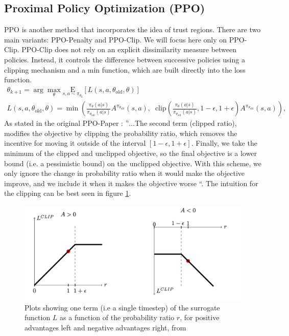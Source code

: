 \subsection{Proximal Policy Optimization (PPO)}
PPO \cite{schulman2017proximalpolicyoptimizationalgorithms} is another method that incorporates the idea of trust regions. There are two main variants: PPO-Penalty and PPO-Clip. We will focus  
here only on PPO-Clip.\newline 
PPO-Clip does not rely on an explicit dissimilarity measure between policies. Instead, it controls the difference between successive 
policies using a clipping mechanism and a min function, which are built directly into the loss function.
\begin{gather*}
\theta_{k+1} = \arg \max_{\theta} \underset{s,a \sim \pi_{\theta_k}}{{\mathrm E}}\left[L(s,a,\theta_\text{old}, \theta)\right] \\
L(s,a,\theta_\text{old},\theta) = \min\left(
\frac{\pi_{\theta}(a|s)}{\pi_{\theta_\text{old}}(a|s)}  A^{\pi_{\theta_\text{old}}}(s,a), \;\;
\text{clip}\left(\frac{\pi_{\theta}(a|s)}{\pi_{\theta_\text{old}}(a|s)}, 1 - \epsilon, 1+\epsilon \right) A^{\pi_{\theta_\text{old}}}(s,a)
\right),
\end{gather*}
As stated in the original PPO-Paper \cite{schulman2017proximalpolicyoptimizationalgorithms} : ''$\dots$The second term (clipped ratio), 
modifies the objective by clipping the probability ratio, which removes the incentive for moving it outside of the interval 
$[1-\epsilon,1+\epsilon]$. Finally, we take the minimum of the clipped and unclipped objective, so the final objective is a 
lower bound (i.e. a pessimistic bound) on the unclipped objective. With this scheme, we only ignore the change in probability 
ratio when it would make the objective improve, and we include it when it makes the objective worse ``.
The intuition for the clipping can be best seen in figure \ref{ppo_lclip}. 
\begin{figure}[H]
    \centering
    \includegraphics[width=0.8\linewidth]{images/ppo_lclip.png}
    \caption{Plots showing one term (i.e a single timestep) of the surrogate function $L$ as a function of the probability ratio $r$, for positive advantages left and negative advantages right, from \cite{schulman2017proximalpolicyoptimizationalgorithms}}
    \label{ppo_lclip}
\end{figure}
